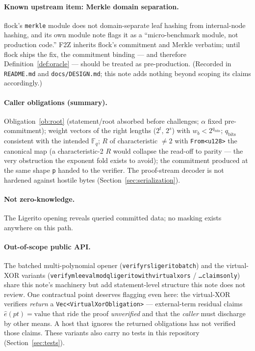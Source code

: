 \documentclass[11pt]{article}
\newcommand{\F}{\mathbb{F}}
\newcommand{\Fq}{\F_q}                 %
\newcommand{\code}[1]{{\def\_{\textunderscore\allowbreak}\texttt{#1}}}
\begin{document}
\paragraph{Known upstream item: Merkle domain separation.}  flock's
\code{merkle} module does not domain-separate leaf hashing from
internal-node hashing, and its own module note flags it as a
``micro-benchmark module, not production code.''  F2Z inherits flock's
commitment and Merkle verbatim; until flock ships the fix, the
commitment binding — and therefore Definition~\ref{def:oracle} — should
be treated as pre-production.  (Recorded in \code{README.md} and
\code{docs/DESIGN.md}; this note adds nothing beyond scoping its claims
accordingly.)

\paragraph{Caller obligations (summary).}  Obligation~\ref{ob:root}
(statement/root absorbed before challenges; $\alpha$ fixed
pre-commitment); weight vectors of the right lengths ($2^t$, $2^s$) with
$w_b < 2^{q_{\mathrm{bits}}}$; $q_{\mathrm{bits}}$ consistent with the
intended $\Fq$; $R$ of characteristic $\ne 2$ with \code{From<u128>} the
canonical map (a characteristic-2 $R$ would collapse the read-off to
parity — the very obstruction the exponent fold exists to avoid); the
commitment produced at the same shape \code{p} handed to the verifier.
The proof-stream decoder is not hardened against hostile bytes
(Section~\ref{sec:serialization}).

\paragraph{Not zero-knowledge.}  The Ligerito opening reveals queried
committed data; no masking exists anywhere on this path.

\paragraph{Out-of-scope public API.}  The batched multi-polynomial
opener (\code{verify\_rs\_ligerito\_batch}) and the virtual-XOR variants
(\code{verify\_mle\_eval\_mod\_q\_ligerito\_with\_virtual\_xors} /
\code{\ldots\_claims\_only}) share this note's machinery but add
statement-level structure this note does not review.  One contractual
point deserves flagging even here: the virtual-XOR verifiers
\emph{return} a \code{Vec<VirtualXorObligation>} — external-term
residual claims $\hat{e}(\mathit{pt}) = \mathrm{value}$ that ride the
proof \emph{unverified} and that the \emph{caller} must discharge by
other means.  A host that ignores the returned obligations has not
verified those claims.  These variants also carry no tests in this
repository (Section~\ref{sec:tests}).
\end{document}

